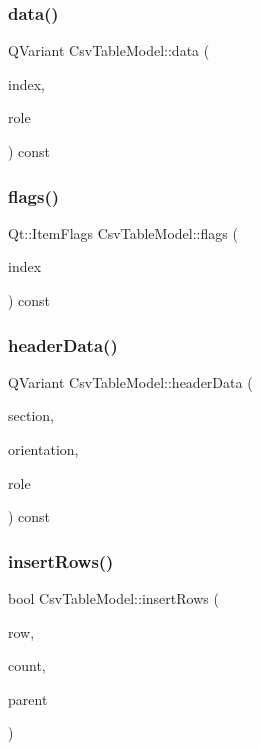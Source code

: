 \subsubsection{\texorpdfstring{data()}{data()}}
{\footnotesize\ttfamily Q\+Variant Csv\+Table\+Model\+::data (\begin{DoxyParamCaption}\item[{const Q\+Model\+Index \&}]{index,  }\item[{int}]{role }\end{DoxyParamCaption}) const}

\mbox{\label{class_csv_table_model_ab7dfc0ee22b0bc5abfe3959f187b848c}} 
\subsubsection{\texorpdfstring{flags()}{flags()}}
{\footnotesize\ttfamily Qt\+::\+Item\+Flags Csv\+Table\+Model\+::flags (\begin{DoxyParamCaption}\item[{const Q\+Model\+Index \&}]{index }\end{DoxyParamCaption}) const}

\mbox{\label{class_csv_table_model_abee635d2b7b7695b319d050903e49c1f}} 
\subsubsection{\texorpdfstring{headerData()}{headerData()}}
{\footnotesize\ttfamily Q\+Variant Csv\+Table\+Model\+::header\+Data (\begin{DoxyParamCaption}\item[{int}]{section,  }\item[{Qt\+::\+Orientation}]{orientation,  }\item[{int}]{role }\end{DoxyParamCaption}) const}

\mbox{\label{class_csv_table_model_aca6f3268be19355cfc9ee07bdbe39f61}} 
\subsubsection{\texorpdfstring{insertRows()}{insertRows()}}
{\footnotesize\ttfamily bool Csv\+Table\+Model\+::insert\+Rows (\begin{DoxyParamCaption}\item[{int}]{row,  }\item[{int}]{count,  }\item[{const Q\+Model\+Index \&}]{parent }\end{DoxyParamCaption})}

